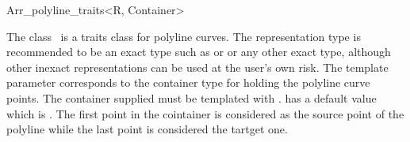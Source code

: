 
\ccRefPageBegin

\begin{ccRefClass}{Arr_polyline_traits<R, Container>}

\ccDefinition
    The class \ccRefName\ is a traits 
    class for polyline curves. 
    The representation type  is recommended to be an
    exact type such as  or
     or any other
    exact type, although other inexact representations can be used at
    the user's own risk.
    The template parameter  corresponds to the container 
    type for 
    holding the polyline curve points. The container supplied must be 
    templated with .  has a default value 
    which is . The first point in the 
    cointainer is considered as the source point of the polyline while the
    last point is considered the tartget one. 


\ccIsModel
     

\end{ccRefClass}



\ccRefPageEnd
